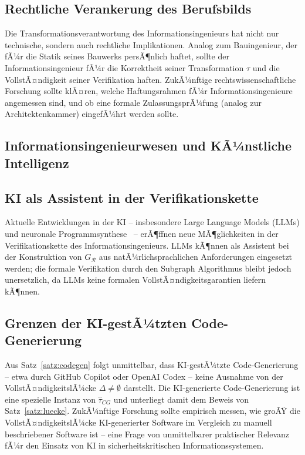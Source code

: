 ﻿\documentclass[a4paper,12pt]{report}
\theoremstyle{definition}
\begin{document}
\subsection{Rechtliche Verankerung des Berufsbilds}

Die Transformationsverantwortung des Informationsingenieurs hat nicht nur technische,
sondern auch rechtliche Implikationen. Analog zum Bauingenieur, der fÃ¼r die Statik
seines Bauwerks persÃ¶nlich haftet, sollte der Informationsingenieur fÃ¼r die Korrektheit
seiner Transformation $\tau$ und die VollstÃ¤ndigkeit seiner Verifikation haften.
ZukÃ¼nftige rechtswissenschaftliche Forschung sollte klÃ¤ren, welche Haftungsrahmen
fÃ¼r Informationsingenieure angemessen sind, und ob eine formale ZulassungsprÃ¼fung
(analog zur Architektenkammer) eingefÃ¼hrt werden sollte.

\subsection{Informationsingenieurwesen und KÃ¼nstliche Intelligenz}

\subsection{KI als Assistent in der Verifikationskette}

Aktuelle Entwicklungen in der KI -- insbesondere Large Language Models (LLMs) und
neuronale Programmsynthese~\cite{chen2021} -- erÃ¶ffnen neue MÃ¶glichkeiten in der
Verifikationskette des Informationsingenieurs. LLMs kÃ¶nnen als Assistent bei der
Konstruktion von $G_\mathcal{R}$ aus natÃ¼rlichsprachlichen Anforderungen eingesetzt
werden; die formale Verifikation durch den Subgraph Algorithmus bleibt jedoch
unersetzlich, da LLMs keine formalen VollstÃ¤ndigkeitsgarantien liefern kÃ¶nnen.

\subsection{Grenzen der KI-gestÃ¼tzten Code-Generierung}

Aus Satz~\ref{satz:codegen} folgt unmittelbar, dass KI-gestÃ¼tzte Code-Generierung --
etwa durch GitHub Copilot oder OpenAI Codex -- keine Ausnahme von der VollstÃ¤ndigkeitslÃ¼cke
$\Delta \neq \emptyset$ darstellt. Die KI-generierte Code-Generierung ist eine
spezielle Instanz von $\hat{\tau}_{CG}$ und unterliegt damit dem Beweis von
Satz~\ref{satz:luecke}. ZukÃ¼nftige Forschung sollte empirisch messen, wie groÃŸ die
VollstÃ¤ndigkeitslÃ¼cke KI-generierter Software im Vergleich zu manuell beschriebener
Software ist -- eine Frage von unmittelbarer praktischer Relevanz fÃ¼r den Einsatz von
KI in sicherheitskritischen Informationssystemen.
\end{document}
